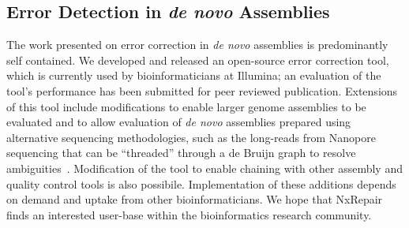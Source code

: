 \subsection{Error Detection in \emph{de novo} Assemblies}
The work presented on error correction in \emph{de novo} assemblies is predominantly self contained. We developed and released an open-source error correction tool, which is currently used by bioinformaticians at Illumina; an evaluation of the tool's performance has been submitted for peer reviewed publication. Extensions of this tool include modifications to enable larger genome assemblies to be evaluated and to allow evaluation of \emph{de novo} assemblies prepared using alternative sequencing methodologies, such as the long-reads from Nanopore sequencing that can be ``threaded'' through a de Bruijn graph to resolve ambiguities~\cite{Koren2015}. Modification of the tool to enable chaining with other assembly and quality control tools is also possibile. Implementation of these additions depends on demand and uptake from other bioinformaticians. We hope that NxRepair finds an interested user-base within the bioinformatics research community.
